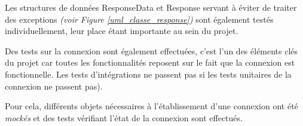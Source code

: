\medbreak

Les structures de données ResponseData et Response servant à éviter de traiter des exceptions \textit{(voir Figure  \ref{uml_classe_response})} sont également testés individuellement, leur place étant importante au sein du projet.

\bigbreak
Des tests sur la connexion sont également effectuées, c'est l'un des éléments clés du projet car toutes les fonctionnalités reposent sur le fait que la connexion est fonctionnelle. Les tests d'intégrations ne passent pas si les tests unitaires de la connexion ne passent pas).

Pour cela, différents objets nécessaires à l'établissement d'une connexion ont été \textit{mockés} et des tests vérifiant l'état de la connexion sont effectués.

